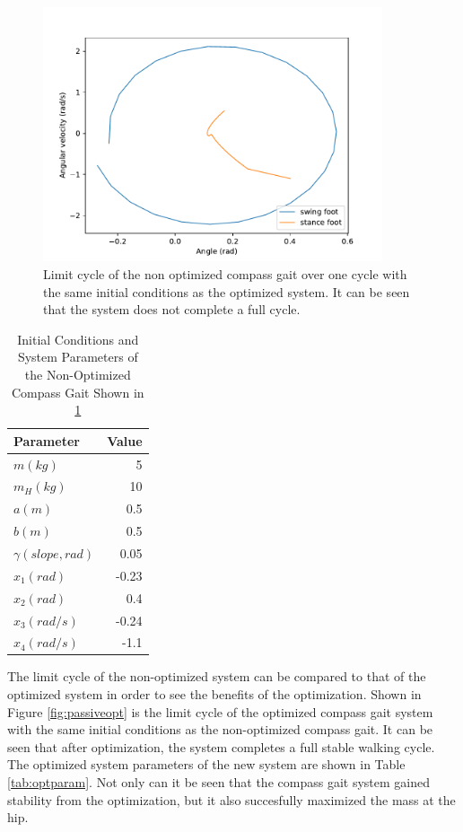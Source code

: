 \documentclass{./springer/svjour3}
\begin{document}
\begin{figure}[h]
\centering
\includegraphics[width=10cm]{./figures/nonopt_limitcycle.pdf}
\caption{Limit cycle of the non optimized compass gait over one cycle with the same initial conditions as the optimized system. It can be seen that the system does not 
complete a full cycle.}
\label{fig:nonoptlimcycle}
\end{figure}

\begin{table}[h]
\centering
\caption{Initial Conditions and System Parameters of the Non-Optimized Compass Gait Shown in \ref{fig:nonoptlimcycle}}
\begin{tabular}{lr}
\toprule
Parameter & Value \\
\midrule
$m (kg)$ & 5 \\
$m_H (kg)$ & 10 \\
$a (m)$ & 0.5 \\
$b (m)$ & 0.5 \\
$\gamma (slope, rad)$ & 0.05 \\
$x_1 (rad)$ & -0.23 \\
$x_2 (rad)$ & 0.4 \\
$x_3 (rad/s)$ & -0.24 \\
$x_4 (rad/s)$ & -1.1 \\
\bottomrule
\end{tabular}
\label{tab:nonoptparam}
\end{table}

The limit cycle of the non-optimized system can be compared to that of the optimized system in order to see the benefits of the optimization.
Shown in Figure \ref{fig:passiveopt} is the limit cycle of the optimized compass gait system with the same initial conditions as the non-optimized compass gait.
It can be seen that after optimization, the system completes a full stable walking cycle.
The optimized system parameters of the new system are shown in Table \ref{tab:optparam}. Not only can it be seen that the compass gait system gained stability from the 
optimization, but it also succesfully maximized the mass at the hip.
\end{document}
